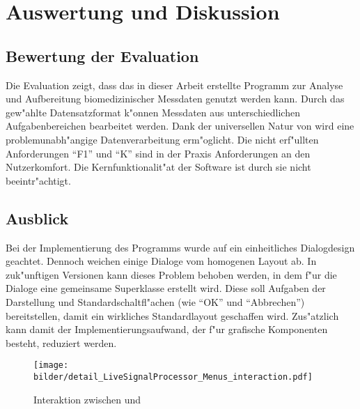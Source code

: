 \chapter{Auswertung und Diskussion}

\section{Bewertung der Evaluation}

Die Evaluation zeigt, dass das in dieser Arbeit erstellte Programm zur Analyse und Aufbereitung biomedizinischer Messdaten genutzt werden kann.
Durch das gew"ahlte Datensatzformat \us k"onnen Messdaten aus unterschiedlichen Aufgabenbereichen bearbeitet werden.
Dank der universellen Natur von \us wird eine problemunabh"angige Datenverarbeitung erm"oglicht.
Die nicht erf"ullten Anforderungen "`F1"' und "`K"' sind in der Praxis Anforderungen an den Nutzerkomfort.
Die Kernfunktionalit"at der Software ist durch sie nicht beeintr"achtigt.

\section{Ausblick}

Bei der Implementierung des Programms wurde auf ein einheitliches Dialogdesign geachtet.
Dennoch weichen einige Dialoge vom homogenen Layout ab.
In zuk"unftigen Versionen kann dieses Problem behoben werden, in dem f"ur die Dialoge eine gemeinsame Superklasse erstellt wird.
Diese soll Aufgaben der Darstellung und Standardschaltfl"achen (wie "`OK"' und "`Abbrechen"') bereitstellen, damit ein wirkliches Standardlayout geschaffen wird.
Zus"atzlich kann damit der Implementierungsaufwand, der f"ur grafische Komponenten besteht, reduziert werden.

\begin{figure}[bth]
\centering
\texttt{[image: bilder/detail\_LiveSignalProcessor\_Menus\_interaction.pdf]}
\caption{Interaktion zwischen  und }
\label{pic:detail_signalprocessing}
\end{figure}

